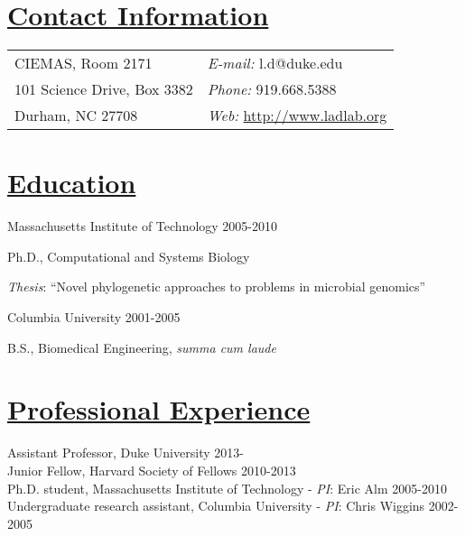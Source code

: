 \documentclass[overlapped,line,11pt]{res}
\newenvironment{list1}{
  \begin{list}{\ding{113}}{%
      \setlength{\itemsep}{0in}
      \setlength{\parsep}{0in} \setlength{\parskip}{0in}
      \setlength{\topsep}{0in} \setlength{\partopsep}{0in} 
      \setlength{\leftmargin}{0.17in}}}{\end{list}}
\begin{document}
\setlength{\pdfpageheight}{\paperheight}
\setlength{\pdfpagewidth}{\paperwidth}


\begin{resume}
\section{\underline{\sc Contact Information}}
\vspace{.05in}
\begin{tabular}{@{}p{4in}p{4in}}

CIEMAS, Room 2171     & {\it E-mail:}    l.d@duke.edu \\                
101 Science Drive, Box 3382   & {\it Phone:} 919.668.5388 \\
Durham, NC 27708 & {\it Web:} \url{http://www.ladlab.org} 

\end{tabular}

\section{\underline{\sc Education}}
\vspace{.05in}
Massachusetts Institute of Technology
\hfill 2005-2010\\

\vspace*{-5mm}
\begin{list1}
\item[] Ph.D., Computational and Systems Biology
\item[] \emph{Thesis}: ``Novel phylogenetic approaches to problems in microbial genomics''
\end{list1}

\vspace*{-2.5mm}
Columbia University \hfill 2001-2005\\
\vspace*{-5mm}
\begin{list1}
\item[] B.S., Biomedical Engineering, \emph{summa cum laude}
\end{list1}

\section{\underline{\sc Professional Experience}}
\vspace{.05in}
Assistant Professor, Duke University \hfill 2013-\hspace{7.5mm} \\
Junior Fellow, Harvard Society of Fellows \hfill 2010-2013\\
Ph.D. student, Massachusetts Institute of Technology - \emph{PI}: Eric Alm \hfill
2005-2010 \\
Undergraduate research assistant, Columbia University - \emph{PI}: Chris Wiggins
\hfill 2002-2005 


\end{resume}
\end{document}
